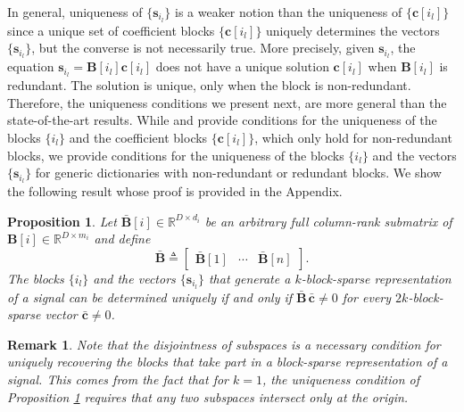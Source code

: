 \documentclass[10pt,twocolumn,twoside] {IEEEtran}
\newtheorem{proposition}{Proposition}
\newtheorem{remark}{Remark}
\begin{document}
{In general, uniqueness of $\{{\boldsymbol{s}}_{i_l}\}$ is a weaker notion than the uniqueness of $\{{\boldsymbol{c}}[i_l]\}$ since a unique set of coefficient blocks $\{ {\boldsymbol{c}}[i_l] \}$ uniquely determines the vectors $\{ {\boldsymbol{s}}_{i_l} \}$, but the converse is not necessarily true. More precisely, given ${\boldsymbol{s}}_{i_l}$, the equation ${\boldsymbol{s}}_{i_l} = {\boldsymbol{B}}[i_l] {\boldsymbol{c}}[i_l]$ does not have a unique solution ${\boldsymbol{c}}[i_l]$ when ${\boldsymbol{B}}[i_l]$ is redundant. The solution is unique, only when the block is non-redundant. Therefore, the uniqueness conditions we present next, are more general than the state-of-the-art results. While \cite{Eldar:TIT09} and \cite{Eldar:TSP10} provide conditions for the uniqueness of the blocks $\{ i_l \}$ and the coefficient blocks $\{ {\boldsymbol{c}}[i_l] \}$, which only hold for non-redundant blocks, we provide conditions for the uniqueness of the blocks $\{ i_l \}$ and the vectors $\{ {\boldsymbol{s}}_{i_l} \}$ for generic dictionaries with non-redundant or redundant blocks. We show the following result whose proof is provided in the Appendix.
\vspace{1mm}
\begin{proposition}
\label{prop:uniqueness1}
Let $\bar{\boldsymbol{B}}[i] \in {\mathbb{R}}^{D \times d_i}$ be an arbitrary full column-rank submatrix of ${\boldsymbol{B}}[i] \in {\mathbb{R}}^{D \times m_i}$ and define
\begin{equation}
\label{eq:Bbar}
\bar{\boldsymbol{B}} \triangleq \begin{bmatrix} \bar{\boldsymbol{B}}[1] & \cdots & \bar{\boldsymbol{B}}[n] \end{bmatrix}.
\end{equation}
The blocks $\{ i_l \}$ and the vectors $\{ {\boldsymbol{s}}_{i_l} \}$ that generate a $k$-block-sparse representation of a signal can be determined uniquely if and only if $\bar{\boldsymbol{B}} \, \bar{\boldsymbol{c}} \neq 0$ for every $2k$-block-sparse vector $\bar{\boldsymbol{c}} \neq 0$. 
\end{proposition}
\vspace{1mm}
\begin{remark}
Note that the disjointness of subspaces is a necessary condition for uniquely recovering the blocks that take part in a block-sparse representation of a signal. This comes from the fact that for $k=1$, the uniqueness condition of Proposition \ref{prop:uniqueness1} requires that any two subspaces intersect only at the origin. 
\end{remark}
\vspace{1mm}

}
\end{document}
